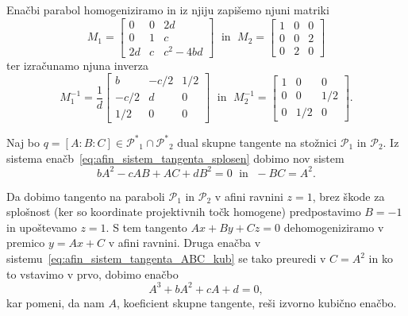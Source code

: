 Enačbi parabol homogeniziramo in iz njiju zapišemo njuni matriki
$$ M_1 =
    \begin{bmatrix}
        0 & 0 & 2d\\
        0 & 1 & c\\
        2d & c & c^2-4bd
    \end{bmatrix}
    \; \text{ in } \; M_2 =
    \begin{bmatrix}
        1 & 0 & 0\\
        0 & 0 & 2\\
        0 & 2 & 0
    \end{bmatrix}
$$
ter izračunamo njuna inverza
$$ M^{-1}_1 = \frac{1}{d}
    \begin{bmatrix}
        b & -c/2 & 1/2\\
        -c/2 & d & 0\\
        1/2 & 0 & 0
    \end{bmatrix}
\; \text{ in } \; M^{-1}_2 =
    \begin{bmatrix}
        1 & 0 & 0\\
        0 & 0 & 1/2\\
        0 & 1/2 & 0
    \end{bmatrix}.
$$

Naj bo $q = [A : B : C] \in \mathcal{P^*}_1 \cap \mathcal{P^*}_2$ dual skupne tangente na stožnici $\mathcal{P}_1$ in $\mathcal{P}_2$. Iz sistema enačb~\eqref{eq:afin_sistem_tangenta_splosen} dobimo nov sistem
\begin{equation}
    \label{eq:afin_sistem_tangenta_ABC_kub}
    bA^2 - cAB + AC + dB^2 = 0 \; \text{ in } \; -BC = A^2.
\end{equation}

Da dobimo tangento na paraboli $\mathcal{P}_1$ in $\mathcal{P}_2$ v afini ravnini $z = 1$, brez škode za splošnost (ker so koordinate projektivnih točk homogene) predpostavimo $B = -1$ in upoštevamo $z = 1$. S tem tangento $Ax + By + Cz = 0$ dehomogeniziramo v premico $y = Ax + C$ v afini ravnini. Druga enačba v sistemu~\eqref{eq:afin_sistem_tangenta_ABC_kub} se tako preuredi v $C = A^2$ in ko to vstavimo v prvo, dobimo enačbo
$$ A^3 + bA^2 + cA + d = 0,$$
kar pomeni, da nam $A$, koeficient skupne tangente, reši izvorno kubično enačbo.


